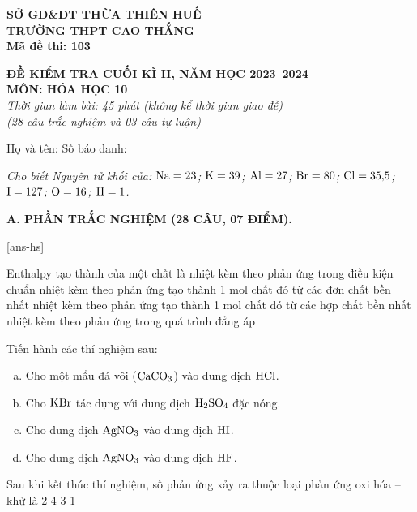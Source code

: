 \documentclass[12pt,a4paper]{article}
\begin{document}
\thispagestyle{firstpage}

\noindent
\begin{minipage}[t]{0.40\textwidth}
	\centering\fontsize{9.5pt}{12pt}\selectfont
	\textbf{SỞ GD\&ĐT THỪA THIÊN HUẾ}\\
	\textbf{TRƯỜNG THPT CAO THẮNG}\\
	\textbf{Mã đề thi: 103}
\end{minipage}\hfill
\begin{minipage}[t]{0.58\textwidth}
	\centering\small
	\textbf{ĐỀ KIỂM TRA CUỐI KÌ II, NĂM HỌC 2023--2024}\\
	\textbf{MÔN: HÓA HỌC 10}\\
	\textit{Thời gian làm bài: 45 phút (không kể thời gian giao đề)}\\
	\textit{(28 câu trắc nghiệm và 03 câu tự luận)}
\end{minipage}

\smallskip
\noindent
Họ và tên: \dotfill Số báo danh: \makebox[4cm]{\dotfill}

\smallskip
\noindent
\textit{Cho biết Nguyên tử khối của: $\ce{Na}=23$; $\ce{K}=39$; $\ce{Al}=27$; $\ce{Br}=80$; $\ce{Cl}=35{,}5$; $\ce{I}=127$; $\ce{O}=16$; $\ce{H}=1$.}

\smallskip
\noindent
\textbf{A. PHẦN TRẮC NGHIỆM (28 CÂU, 07 ĐIỂM).}

[ans-hs]

\begin{ex}
Enthalpy tạo thành của một chất là
\choice
{nhiệt kèm theo phản ứng trong điều kiện chuẩn}
{nhiệt kèm theo phản ứng tạo thành 1 mol chất đó từ các đơn chất bền nhất}
{nhiệt kèm theo phản ứng tạo thành 1 mol chất đó từ các hợp chất bền nhất}
{nhiệt kèm theo phản ứng trong quá trình đẳng áp}
\end{ex}

\begin{ex}
Tiến hành các thí nghiệm sau:
\begin{enumerate}[(a)]
	\item Cho một mẩu đá vôi ($\ce{CaCO3}$) vào dung dịch $\ce{HCl}$.
	\item Cho $\ce{KBr}$ tác dụng với dung dịch $\ce{H2SO4}$ đặc nóng.
	\item Cho dung dịch $\ce{AgNO3}$ vào dung dịch $\ce{HI}$.
	\item Cho dung dịch $\ce{AgNO3}$ vào dung dịch $\ce{HF}$.
\end{enumerate}
Sau khi kết thúc thí nghiệm, số phản ứng xảy ra thuộc loại phản ứng oxi hóa -- khử là
\choice
{2}
{4}
{3}
{1}
\end{ex}
\end{document}
